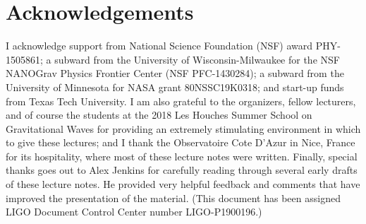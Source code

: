 \section*{Acknowledgements}
\label{s:acknowledgements}

I acknowledge support from National Science Foundation (NSF)
award PHY-1505861; a subward from the University of Wisconsin-Milwaukee
for the NSF NANOGrav Physics Frontier Center (NSF PFC-1430284); 
a subward from the University of Minnesota for NASA grant 80NSSC19K0318; 
and start-up funds from Texas Tech University.
I am also grateful to the organizers, fellow lecturers, and of course
the students at the 2018 Les Houches Summer School on Gravitational 
Waves for providing an extremely stimulating environment in which to 
give these lectures; and I thank the Observatoire Cote D'Azur in Nice, 
France for its hospitality, where most of these lecture notes were written.
Finally, special thanks goes out to  Alex Jenkins for carefully 
reading through several early drafts of these lecture notes.
He provided very helpful feedback and comments that have improved 
the presentation of the material.
(This document has been assigned LIGO Document Control Center number
LIGO-P1900196.) 
